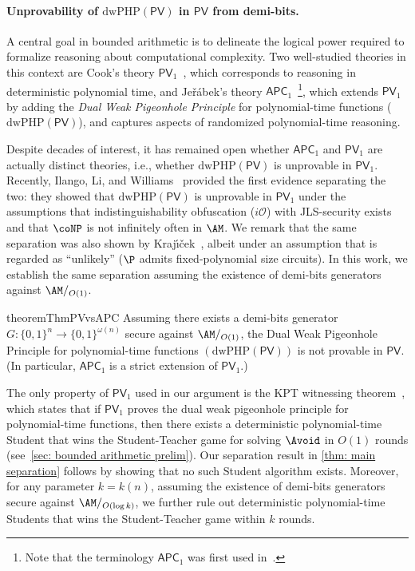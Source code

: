 \documentclass[10pt,a4paper]{article}
\theoremstyle{definition}
\theoremstyle{remark}
\newcommand{\dwPHP}{\mathrm{dwPHP}}
\newcommand{\PV}{\mathsf{PV}}
\newcommand{\APC}{\mathsf{APC}}
\newcommand{\Krajicek}{Kraj\'{\i}\v{c}ek\xspace}
\newcommand{\iO}{i\mathcal{O}}
\begin{document}
\paragraph{Unprovability of $\dwPHP(\PV)$ in $\PV$ from demi-bits.} A central goal in bounded arithmetic is to delineate the logical power required to formalize reasoning about computational complexity. Two well-studied theories in this context are Cook’s theory $\PV_1$~\cite{Cook75}, which corresponds to reasoning in deterministic polynomial time, and Jeřábek’s theory $\APC_1$~\cite{Jerabek04, Jerabek07}\footnote{Note that the terminology $\APC_1$ was first used in~\cite{BussKT14}.}, which extends $\PV_1$ by adding the \emph{Dual Weak Pigeonhole Principle} for polynomial-time functions ($\dwPHP(\PV)$), and captures aspects of randomized polynomial-time reasoning.

Despite decades of interest, it has remained open whether $\APC_1$ and $\PV_1$ are actually distinct theories, i.e., whether $\dwPHP(\PV)$ is unprovable in $\PV_1$. Recently, Ilango, Li, and Williams~\cite{DBLP:conf/stoc/IlangoLW23} provided the first evidence separating the two: they showed that $\dwPHP(\PV)$ is unprovable in $\PV_1$ under the assumptions that indistinguishability obfuscation ($\iO$) with JLS-security exists and that $\coNP$ is not infinitely often in $\AM$. We remark that the same separation was also shown by \Krajicek~\cite{Krajicek21}, albeit under an assumption that is regarded as ``unlikely'' ($\P$ admits fixed-polynomial size circuits). In this work, we establish the same separation assuming the existence of demi-bits generators against $\AM/_{O(1)}$.

\begin{restatable}{theorem}{ThmPVvsAPC}\label{thm: main separation}
    Assuming there exists a demi-bits generator $G: \{0,1\}^n \to \{0,1\}^{\omega(n)}$ secure against $\AM/_{O(1)}$, the Dual Weak Pigeonhole Principle for polynomial-time functions $(\dwPHP(\PV))$ is not provable in $\PV$. (In particular, $\APC_1$ is a strict extension of $\PV_1$.)
\end{restatable}

The only property of $\PV_1$ used in our argument is the KPT witnessing theorem~\cite{KRAJICEK1991143}, which states that if $\PV_1$ proves the dual weak pigeonhole principle for polynomial-time functions, then there exists a deterministic polynomial-time Student that wins the Student-Teacher game for solving $\Avoid$ in $O(1)$ rounds (see~\autoref{sec: bounded arithmetic prelim}). Our separation result in \autoref{thm: main separation} follows by showing that no such Student algorithm exists.%
Moreover, for any parameter $k = k(n)$, assuming the existence of demi-bits generators secure against $\AM/_{O(\log k)}$, we further rule out deterministic polynomial-time Students that wins the Student-Teacher game within $k$ rounds.%
\end{document}
